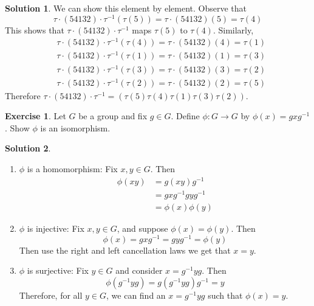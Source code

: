 \documentclass[12pt]{article}
\theoremstyle{definition}
\newtheorem{exercise}{\color{YellowOrange}Exercise}
\theoremstyle{definition}
\newtheorem{solution}{\color{Goldenrod}Solution}
\begin{document}
\begin{solution}
We can show this element by element. Observe that
\begin{equation}
	\tau \cdot (54132) \cdot \tau^{-1}(\tau(5)) = \tau \cdot (54132)(5) = \tau(4)
\end{equation}
This shows that $\tau \cdot (54132) \cdot \tau^{-1}$ maps $\tau(5)$ to $\tau(4)$. Similarly,
\begin{align}
&\tau \cdot (54132) \cdot \tau^{-1}(\tau(4)) = \tau \cdot (54132)(4) = \tau(1) \\
&\tau \cdot (54132) \cdot \tau^{-1}(\tau(1)) = \tau \cdot (54132)(1) = \tau(3) \\
&\tau \cdot (54132) \cdot \tau^{-1}(\tau(3)) = \tau \cdot (54132)(3) = \tau(2) \\
&\tau \cdot (54132) \cdot \tau^{-1}(\tau(2)) = \tau \cdot (54132)(2) = \tau(5) 
\end{align}
Therefore $\tau \cdot (5 4 1 3 2) \cdot \tau^{-1} = (\tau(5) \tau(4) \tau(1) \tau(3) \tau(2))
$.
\end{solution}		

\begin{exercise}
Let $G$ be a group and fix $g \in G$. Define $\phi : G \to G$ by $\phi(x) = gxg^{-1}$. Show $\phi$ is an isomorphism.
\end{exercise}
\begin{solution}
\begin{enumerate}
	\item $\phi$ is a homomorphism: Fix $x, y \in G$. Then
	\begin{align*}
	\phi(xy) &= g (xy) g^{-1} \\
	&= g x g^{-1} g y g^{-1} \\
	&= \phi(x) \phi(y)
	\end{align*}
	\item $\phi$ is injective: Fix $x, y \in G$, and suppose $\phi(x)=\phi(y)$. Then
	\begin{equation}
		\phi(x) = g x g^{-1} = g y g^{-1} = \phi(y) 
	\end{equation}
	Then use the right and left cancellation laws we get that $x = y$.
	\item $\phi$ is surjective: Fix $y \in G$ and consider $x = g^{-1} y g$. Then
	\begin{equation}
		\phi(g^{-1}yg) = g (g^{-1}yg) g^{-1} = y
	\end{equation}
	Therefore, for all $y \in G$, we can find an $x = g^{-1} y g$ such that $\phi(x) = y$.
\end{enumerate}
\end{solution}
\end{document}
